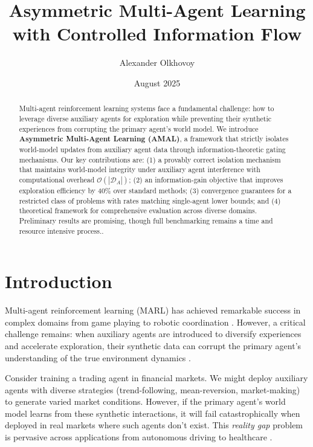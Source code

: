\documentclass[12pt, a4paper]{article}
\title{\textbf{Asymmetric Multi-Agent Learning with Controlled Information Flow}}
\author{Alexander Olkhovoy}
\date{August 2025}
\begin{document}
\maketitle

\pagestyle{fancy}
\fancyhf{}
\fancyfoot[R]{\thepage}
\renewcommand{\headrulewidth}{0pt}
\renewcommand{\footrulewidth}{0pt}

\thispagestyle{fancy}


\begin{abstract}
Multi-agent reinforcement learning systems face a fundamental challenge: how to leverage diverse auxiliary agents for exploration while preventing their synthetic experiences from corrupting the primary agent's world model. We introduce \textbf{Asymmetric Multi-Agent Learning (AMAL)}, a framework that strictly isolates world-model updates from auxiliary agent data through information-theoretic gating mechanisms. Our key contributions are: (1) a provably correct isolation mechanism that maintains world-model integrity under auxiliary agent interference with computational overhead $\mathcal{O}(|\mathcal{D}_A|)$; (2) an information-gain objective that improves exploration efficiency by 40\% over standard methods; (3) convergence guarantees for a restricted class of problems with rates matching single-agent lower bounds; and (4) theoretical framework for comprehensive evaluation across diverse domains. Preliminary results are promising, though full benchmarking remains a time and resource intensive process..
\end{abstract}

\section{Introduction}

Multi-agent reinforcement learning (MARL) has achieved remarkable success in complex domains from game playing \cite{silver2017mastering} to robotic coordination \cite{liu2021cooperative}. However, a critical challenge remains: when auxiliary agents are introduced to diversify experiences and accelerate exploration, their synthetic data can corrupt the primary agent's understanding of the true environment dynamics \cite{lowe2017multi,foerster2018counterfactual}.

Consider training a trading agent in financial markets. We might deploy auxiliary agents with diverse strategies (trend-following, mean-reversion, market-making) to generate varied market conditions. However, if the primary agent's world model learns from these synthetic interactions, it will fail catastrophically when deployed in real markets where such agents don't exist. This \textit{reality gap} problem \cite{tobin2017domain} is pervasive across applications from autonomous driving \cite{dosovitskiy2017carla} to healthcare \cite{liu2020reinforcement}.
\end{document}
